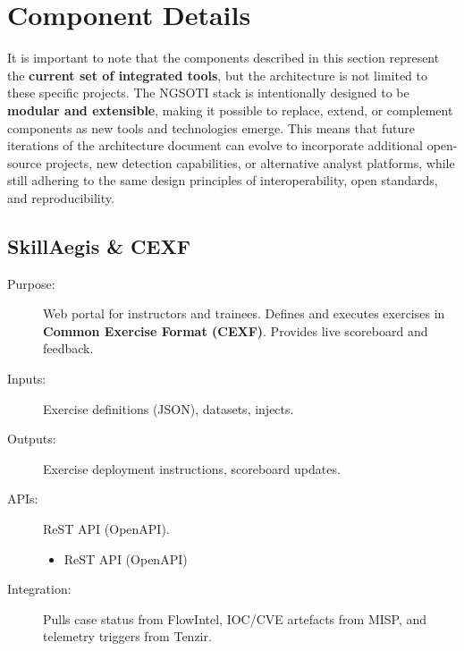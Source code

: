\documentclass[10pt,a4paper]{report}
\begin{document}
\section{Component Details}

It is important to note that the components described in this section
represent the \textbf{current set of integrated tools}, but the architecture is
not limited to these specific projects. The NGSOTI stack is intentionally
designed to be \textbf{modular and extensible}, making it possible to replace,
extend, or complement components as new tools and technologies emerge. This
means that future iterations of the architecture document can evolve to
incorporate additional open-source projects, new detection capabilities, or
alternative analyst platforms, while still adhering to the same design
principles of interoperability, open standards, and reproducibility.

\subsection{SkillAegis \& CEXF}
\begin{description}
  \item[Purpose:] Web portal for instructors and trainees. Defines and executes
exercises in \textbf{Common Exercise Format (CEXF)}. Provides live scoreboard and feedback.
  \item[Inputs:] Exercise definitions (JSON), datasets, injects.
  \item[Outputs:] Exercise deployment instructions, scoreboard updates.
  \item[APIs:] ReST API (OpenAPI).
    \begin{itemize}
        \item ReST API (OpenAPI)
    \end{itemize}
  \item[Integration:] Pulls case status from FlowIntel, IOC/CVE
artefacts from MISP, and telemetry triggers from Tenzir.
\end{description}


\end{document}
